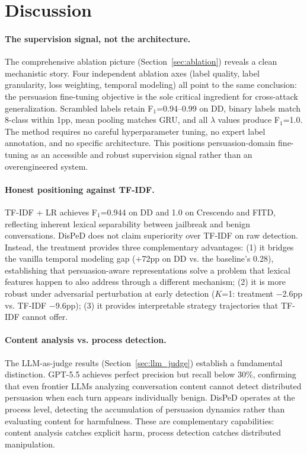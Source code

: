 \documentclass[11pt,a4paper]{article}
\newcommand{\ours}{DisPeD}
\newcommand{\fone}{F$_1$}
\begin{document}
\section{Discussion}

\paragraph{The supervision signal, not the architecture.}
The comprehensive ablation picture (Section~\ref{sec:ablation}) reveals a clean mechanistic story. Four independent ablation axes (label quality, label granularity, loss weighting, temporal modeling) all point to the same conclusion: the persuasion fine-tuning objective is the sole critical ingredient for cross-attack generalization. Scrambled labels retain \fone{}=0.94--0.99 on DD, binary labels match 8-class within 1pp, mean pooling matches GRU, and all $\lambda$ values produce \fone{}=1.0. The method requires no careful hyperparameter tuning, no expert label annotation, and no specific architecture. This positions persuasion-domain fine-tuning as an accessible and robust supervision signal rather than an overengineered system.

\paragraph{Honest positioning against TF-IDF.}
TF-IDF + LR achieves \fone{}=0.944 on DD and 1.0 on Crescendo and FITD, reflecting inherent lexical separability between jailbreak and benign conversations. \ours{} does not claim superiority over TF-IDF on raw detection. Instead, the treatment provides three complementary advantages: (1) it bridges the vanilla temporal modeling gap (+72pp on DD vs. the baseline's 0.28), establishing that persuasion-aware representations solve a problem that lexical features happen to also address through a different mechanism; (2) it is more robust under adversarial perturbation at early detection ($K$=1: treatment $-$2.6pp vs. TF-IDF $-$9.6pp); (3) it provides interpretable strategy trajectories that TF-IDF cannot offer.

\paragraph{Content analysis vs. process detection.}
The LLM-as-judge results (Section~\ref{sec:llm_judge}) establish a fundamental distinction. GPT-5.5 achieves perfect precision but recall below 30\%, confirming that even frontier LLMs analyzing conversation content cannot detect distributed persuasion when each turn appears individually benign. \ours{} operates at the process level, detecting the accumulation of persuasion dynamics rather than evaluating content for harmfulness. These are complementary capabilities: content analysis catches explicit harm, process detection catches distributed manipulation.
\end{document}
